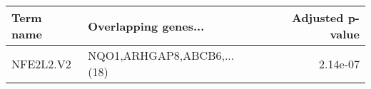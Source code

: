 \begin{tabular}{llr}
\toprule
Term name &       Overlapping genes... &  Adjusted p-value \\
\midrule
NFE2L2.V2 & NQO1,ARHGAP8,ABCB6,...(18) &          2.14e-07 \\
\bottomrule
\end{tabular}
